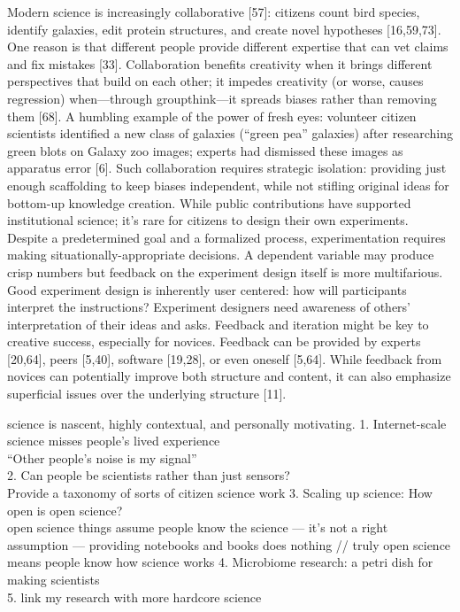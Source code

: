 Modern science is increasingly collaborative
[57]: citizens count bird species, identify galaxies, edit protein structures, and create novel hypotheses [16,59,73]. One reason is that different people provide different expertise that can vet
claims and fix mistakes [33]. Collaboration benefits creativity when it brings different perspectives that build on each other; it impedes creativity (or worse, causes regression) when—through
groupthink—it spreads biases rather than removing them [68]. A humbling example of the power
of fresh eyes: volunteer citizen scientists identified a new class of galaxies (“green pea” galaxies)
after researching green blots on Galaxy zoo images; experts had dismissed these images as apparatus error [6]. Such collaboration requires strategic isolation: providing just enough scaffolding
to keep biases independent, while not stifling original ideas for bottom-up knowledge creation.
While public contributions have supported institutional science; it’s rare for citizens to design
their own experiments. Despite a predetermined goal and a formalized process, experimentation
requires making situationally-appropriate decisions. A dependent variable may produce crisp
numbers but feedback on the experiment design itself is more multifarious. Good experiment
design is inherently user centered: how will participants interpret the instructions? Experiment
designers need awareness of others’ interpretation of their ideas and asks. Feedback and iteration
might be key to creative success, especially for novices. Feedback can be provided by experts
[20,64], peers [5,40], software [19,28], or even oneself [5,64]. While feedback from novices can
potentially improve both structure and content, it can also emphasize superficial issues over the
underlying structure [11].


science is nascent, highly contextual, and personally motivating.
1. Internet-scale science misses people’s lived experience \\
 “Other people’s noise is my signal” \\
2. Can people be scientists rather than just sensors? \\
 Provide a taxonomy of sorts of citizen science work
3. Scaling up science: How open is open science? \\
 open science things assume people know the science — it’s not a right assumption — providing notebooks and books does nothing // truly open science means people know how science works
4. Microbiome research: a petri dish for making scientists \\
5. link my research with more hardcore science

